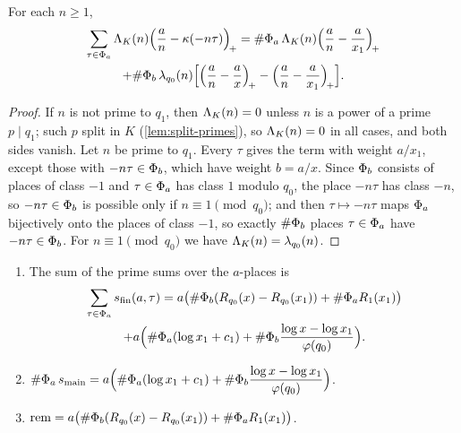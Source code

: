\begin{lemma}\label{lem:sum-over-a-places}
For each $n\ge1$,
\begin{multline*}
  \sum_{\tau\in\Phi_a}\Lambda_K(n)\Bigl(\frac an-\kappa(-n\tau)\Bigr)_{\!+}
  =\#\Phi_a\,\Lambda_K(n)\Bigl(\frac an-\frac a{x_1}\Bigr)_{\!+}\\
  +\#\Phi_b\,\lambda_{q_0}(n)\Bigl[\Bigl(\frac an-\frac ax\Bigr)_{\!+}-\Bigl(\frac an-\frac a{x_1}\Bigr)_{\!+}\Bigr].
\end{multline*}
\end{lemma}

\begin{proof}
If $n$ is not prime to $q_1$, then $\Lambda_K(n)=0$ unless $n$ is a power of a prime $p\mid q_1$; such
$p$ split in $K$ (\cref{lem:split-primes}), so $\Lambda_K(n)=0$ in all cases, and both sides vanish.
Let $n$ be prime to $q_1$. Every $\tau$ gives the term with weight $a/x_1$, except those with
$-n\tau\in\Phi_b$, which have weight $b=a/x$. Since $\Phi_b$ consists of places of class $-1$ and
$\tau\in\Phi_a$ has class $1$ modulo $q_0$, the place $-n\tau$ has class $-n$, so $-n\tau\in\Phi_b$ is
possible only if $n\equiv1\pmod{q_0}$; and then $\tau\mapsto-n\tau$ maps $\Phi_a$ bijectively onto the
places of class $-1$, so exactly $\#\Phi_b$ places $\tau\in\Phi_a$ have $-n\tau\in\Phi_b$. For
$n\equiv1\pmod{q_0}$ we have $\Lambda_K(n)=\lambda_{q_0}(n)$.
\end{proof}

\begin{proposition}\label{prop:total-remainder}
\begin{enumerate}[label=\textup{(\alph*)}]
\item The sum of the prime sums over the $a$-places is
\begin{multline*}
  \sum_{\tau\in\Phi_a}s_{\mathrm{fin}}(a,\tau)
  =a\bigl(\#\Phi_b(R_{q_0}(x)-R_{q_0}(x_1))+\#\Phi_a R_1(x_1)\bigr)\\
  +a\Bigl(\#\Phi_a(\log x_1+c_1)+\#\Phi_b\frac{\log x-\log x_1}{\varphi(q_0)}\Bigr).
\end{multline*}
\item $\displaystyle\#\Phi_a\,s_{\mathrm{main}}=a\Bigl(\#\Phi_a(\log x_1+c_1)+\#\Phi_b\frac{\log x-\log x_1}{\varphi(q_0)}\Bigr)$.
\item $\mathrm{rem}=a\bigl(\#\Phi_b(R_{q_0}(x)-R_{q_0}(x_1))+\#\Phi_a R_1(x_1)\bigr)$.
\end{enumerate}
\end{proposition}

